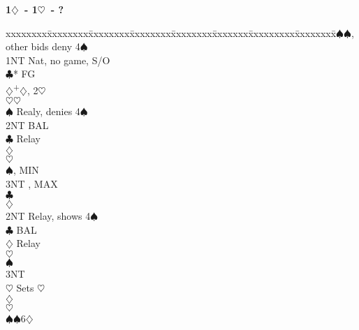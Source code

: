 \documentclass[10pt]{article}
\renewcommand{\c}{$\clubsuit$}
\renewcommand{\d}{$\diamondsuit$}
\newcommand{\h}{$\heartsuit$}
\newcommand{\s}{$\spadesuit$}
\newcommand{\p}{\textsuperscript{+}}
\newcommand{\m}{\textsuperscript{\textminus}}
\newenvironment{bidtable}[1][]
{\textbf{#1}
  \begin{adjustwidth}{1em}{}
    \addvspace{2pt}
    \begin{tabbing}
      xxxxxxxx\=xxxxxxxx\=xxxxxxxx\=xxxxxxxx\=xxxxxxxx\=xxxxxxx\=xxxxxxxxx\=xxxxxxxx\=\kill}
{\end{tabbing}\end{adjustwidth}\bigskip}%
\begin{document}
\begin{bidtable}[1\d\ - 1\h\ - ?]
1\s  {}\s, other bids deny 4\s                                \\
     \> 1NT  \> Nat, no game, S/O                               \\
     \c* \> FG                                              \\
     \>      \d {}\p\d, 2\m\h                             \\
     \>      \h {}\h                                      \\
     \>      \>     \s  \> Realy, denies 4\s                \\
     \>      \>     \>      \> 2NT   \> BAL                     \\
     \>      \>     \>      \>       \c \> Relay            \\
     \>      \>     \>      \>       \>     \d {}      \\
     \>      \>     \>      \>       \>     \h {}      \\
     \>      \>     \>      \>       \>     \s {}, MIN \\
     \>      \>     \>      \>       \>     \> 3NT , MAX \\
     \>      \>     \>      \c   {}                    \\
     \>      \>     \>      \d   {}                    \\
     \>      \>     \> 2NT  \> Relay, shows 4\s                 \\
     \>      \>     \>      \c   \> BAL                     \\
     \>      \>     \>      \>       \d \> Relay            \\
     \>      \>     \>      \>       \>     \h {}      \\
     \>      \>     \>      \>       \>     \s {}      \\
     \>      \>     \>      \>       \>     \> 3NT       \\
     \>      \>     \>      \>       \h \> Sets \h          \\
     \>      \>     \>      \d   {}                    \\
     \>      \>     \>      \h   {}                    \\
     \>      \s {}\s 6\d                                  \\

\end{bidtable}
\end{document}
